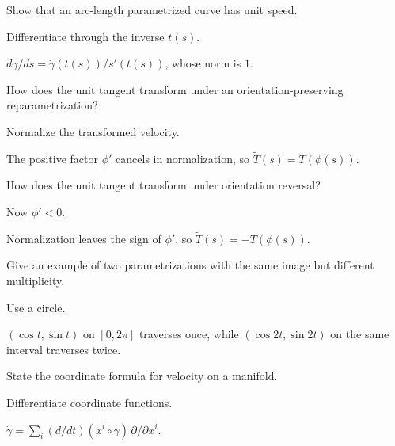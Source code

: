 \begin{exercise}\label{exr:vii12-16}
Show that an arc-length parametrized curve has unit speed.
\end{exercise}
\begin{hint}
Differentiate through the inverse $t(s)$.
\end{hint}
\begin{solution}
$d\gamma/ds=\dot\gamma(t(s))/s'(t(s))$, whose norm is $1$.
\end{solution}

\begin{exercise}\label{exr:vii12-17}
How does the unit tangent transform under an orientation-preserving reparametrization?
\end{exercise}
\begin{hint}
Normalize the transformed velocity.
\end{hint}
\begin{solution}
The positive factor $\phi'$ cancels in normalization, so $\widetilde T(s)=T(\phi(s))$.
\end{solution}

\begin{exercise}\label{exr:vii12-18}
How does the unit tangent transform under orientation reversal?
\end{exercise}
\begin{hint}
Now $\phi'<0$.
\end{hint}
\begin{solution}
Normalization leaves the sign of $\phi'$, so $\widetilde T(s)=-T(\phi(s))$.
\end{solution}

\begin{exercise}\label{exr:vii12-19}
Give an example of two parametrizations with the same image but different multiplicity.
\end{exercise}
\begin{hint}
Use a circle.
\end{hint}
\begin{solution}
$(\cos t,\sin t)$ on $[0,2\pi]$ traverses once, while $(\cos2t,\sin2t)$ on the same interval traverses twice.
\end{solution}

\begin{exercise}\label{exr:vii12-20}
State the coordinate formula for velocity on a manifold.
\end{exercise}
\begin{hint}
Differentiate coordinate functions.
\end{hint}
\begin{solution}
$\dot\gamma=\sum_i(d/dt)(x^i\circ\gamma)\,\partial/\partial x^i$.
\end{solution}

